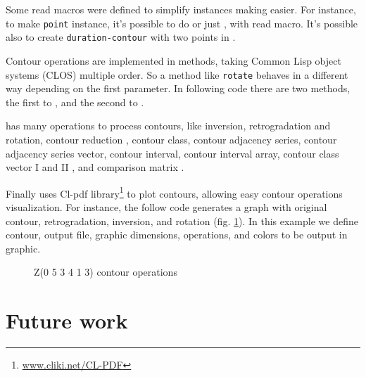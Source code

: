 Some read macros were defined to simplify instances making easier. For
instance, to make \texttt{point} instance, it's possible to do
 or just , with
read macro. It's possible also to create \texttt{duration-contour}
with two points in .

Contour operations are implemented in methods, taking Common Lisp
object systems (CLOS) multiple order. So a method like \texttt{rotate}
behaves in a different way depending on the first parameter. In
following code there are two methods, the first to
, and the second to .



\goiaba{} has many operations to process contours, like inversion,
retrogradation and rotation, contour reduction \cite{adams76:melodic},
contour class, contour adjacency series, contour adjacency series
vector, contour interval, contour interval array, contour class vector
I and II \cite{friedmann85:methodology}, and comparison matrix
\cite{morris93:directions}.

Finally \goiaba{} uses Cl-pdf
library\footnote{\url{www.cliki.net/CL-PDF}} to plot contours,
allowing easy contour operations visualization. For instance, the
follow code generates a graph with original contour, retrogradation,
inversion, and rotation (fig. \ref{fig:operacoes}). In this example we
define  contour, output file, graphic dimensions, operations,
and colors to be output in graphic.


\begin{figure}
  \centering
  \caption{Z(0 5 3 4 1 3) contour operations}
  \label{fig:operacoes}
\end{figure}

\section{Future work}
\label{sec:future-work}

